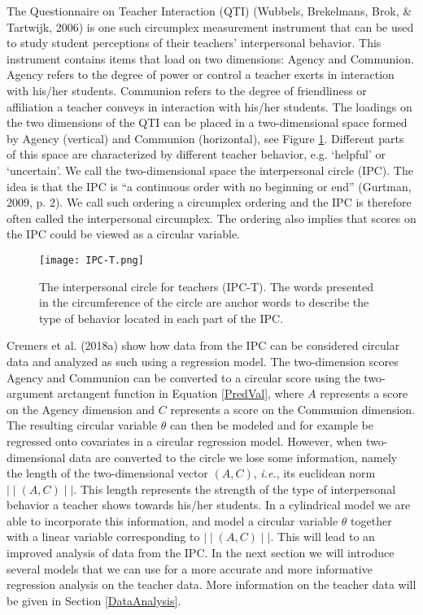 \documentclass[11pt,]{article}
\begin{document}
The Questionnaire on Teacher Interaction (QTI) (Wubbels, Brekelmans,
Brok, \& Tartwijk, 2006) is one such circumplex measurement instrument
that can be used to study student perceptions of their teachers'
interpersonal behavior. This instrument contains items that load on two
dimensions: Agency and Communion. Agency refers to the degree of power
or control a teacher exerts in interaction with his/her students.
Communion refers to the degree of friendliness or affiliation a teacher
conveys in interaction with his/her students. The loadings on the two
dimensions of the QTI can be placed in a two-dimensional space formed by
Agency (vertical) and Communion (horizontal), see Figure \ref{QTI}.
Different parts of this space are characterized by different teacher
behavior, e.g. `helpful' or `uncertain'. We call the two-dimensional
space the interpersonal circle (IPC). The idea is that the IPC is ``a
continuous order with no beginning or end'' (Gurtman, 2009, p. 2). We
call such ordering a circumplex ordering and the IPC is therefore often
called the interpersonal circumplex. The ordering also implies that
scores on the IPC could be viewed as a circular variable.

\begin{figure}
\centering
\texttt{[image: IPC-T.png]}
\caption{The interpersonal circle for teachers (IPC-T). The words presented in
the circumference of the circle are anchor words to describe the type of
behavior located in each part of the IPC.}
\label{QTI}
\end{figure}

Cremers et al. (2018a) show how data from the IPC can be considered
circular data and analyzed as such using a regression model. The
two-dimension scores Agency and Communion can be converted to a circular
score using the two-argument arctangent function in Equation
\eqref{PredVal}, where \(A\) represents a score on the Agency dimension
and \(C\) represents a score on the Communion dimension. The resulting
circular variable \(\theta\) can then be modeled and for example be
regressed onto covariates in a circular regression model. However, when
two-dimensional data are converted to the circle we lose some
information, namely the length of the two-dimensional vector \((A, C)\),
\emph{i.e.}, its euclidean norm \(\mid\mid (A, C) \mid\mid\). This
length represents the strength of the type of interpersonal behavior a
teacher shows towards his/her students. In a cylindrical model we are
able to incorporate this information, and model a circular variable
\(\theta\) together with a linear variable corresponding to
\(\mid\mid (A, C) \mid\mid\). This will lead to an improved analysis of
data from the IPC. In the next section we will introduce several models
that we can use for a more accurate and more informative regression
analysis on the teacher data. More information on the teacher data will
be given in Section \ref{DataAnalysis}.
\end{document}
